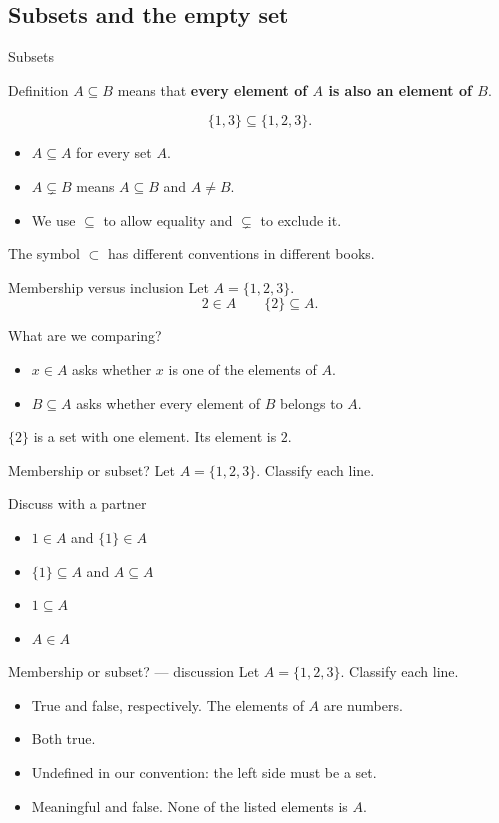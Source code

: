 \documentclass{beamer}
\begin{document}
\subsection{Subsets and the empty set}
\begin{frame}{Subsets}
\begin{block}{Definition}
$A\subseteq B$ means that \textbf{every element of $A$ is also an element of $B$}.
\end{block}\[\{1,3\}\subseteq\{1,2,3\}.\]\begin{itemize}
\item $A\subseteq A$ for every set $A$.
\item $A\subsetneq B$ means $A\subseteq B$ and $A\ne B$.
\item We use $\subseteq$ to allow equality and $\subsetneq$ to exclude it.
\end{itemize}\medskip The symbol $\subset$ has different conventions in different books.
\end{frame}
\begin{frame}{Membership versus inclusion}
Let $A=\{1,2,3\}$.\[2\in A\qquad\{2\}\subseteq A.\]\begin{block}{What are we comparing?}
\begin{itemize}
\item $x\in A$ asks whether $x$ is one of the elements of $A$.
\item $B\subseteq A$ asks whether every element of $B$ belongs to $A$.
\end{itemize}
\end{block}\medskip $\{2\}$ is a set with one element. Its element is $2$.
\end{frame}
\begin{frame}{Membership or subset?}
Let $A=\{1,2,3\}$. Classify each line.
\begin{block}{Discuss with a partner}
\begin{itemize}
\item $1\in A$ and $\{1\}\in A$
\item $\{1\}\subseteq A$ and $A\subseteq A$
\item $1\subseteq A$
\item $A\in A$
\end{itemize}
\end{block}
\end{frame}
\begin{frame}{Membership or subset? --- discussion}
Let $A=\{1,2,3\}$. Classify each line.
\begin{itemize}
\item True and false, respectively. The elements of $A$ are numbers.
\item Both true.
\item Undefined in our convention: the left side must be a set.
\item Meaningful and false. None of the listed elements is $A$.
\end{itemize}
\end{frame}
\end{document}
